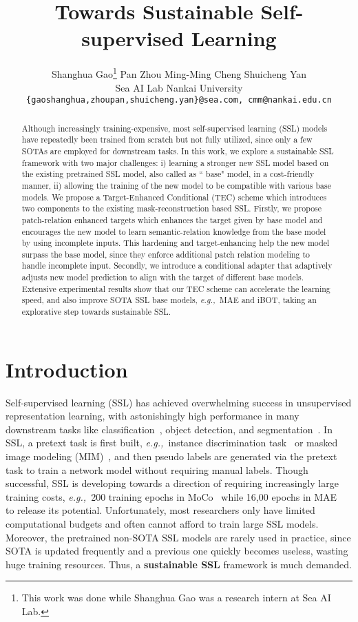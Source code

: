 \documentclass{article} \usepackage{iclr2023_conference,times}
\title{Towards Sustainable Self-supervised Learning}
\author{Shanghua Gao\thanks{This work was done while Shanghua Gao was a research intern at Sea AI Lab.} \quad
Pan Zhou \quad
Ming-Ming Cheng \quad
Shuicheng Yan \\
Sea AI Lab \quad Nankai University \\
\texttt{\{gaoshanghua,zhoupan,shuicheng.yan\}@sea.com, cmm@nankai.edu.cn} \\
}
\def\eg{\emph{e.g.,~}}
\begin{document}
\maketitle
\begin{abstract}

Although increasingly training-expensive, 
most self-supervised learning (SSL) models 
have repeatedly been trained from scratch
but not fully utilized, since 
only a few SOTAs are employed for downstream tasks. 
In this work, we explore a sustainable SSL framework 
with  two major challenges: 
i) learning a stronger new SSL model based on the existing 
pretrained SSL model, also called as `` base" model,  in a cost-friendly manner,
ii) allowing the training of the new model to be compatible with
various base models. 
We propose a Target-Enhanced Conditional (TEC) scheme 
which introduces two components to the existing mask-reconstruction based SSL.  
Firstly, we propose patch-relation enhanced targets which enhances the target given by base model and  encourages 
the new model to learn semantic-relation knowledge from the base model by using   
incomplete inputs. 
This hardening and target-enhancing help the new model surpass the base model, 
since they enforce additional patch relation modeling to handle incomplete input.  
Secondly, we introduce a conditional adapter that 
adaptively adjusts new model prediction to align with the target of different base models. 
Extensive experimental results show  that our TEC scheme can accelerate the 
learning speed, and also improve SOTA SSL base models, \eg MAE and iBOT,  
taking an explorative step towards sustainable SSL.
    
\end{abstract}

\section{Introduction}
\vspace{-10pt}
\label{sec:intro}
Self-supervised learning (SSL) has achieved overwhelming success 
in unsupervised representation learning, 
with astonishingly high performance in many downstream tasks 
like classification~\citep{zhou2021ibot,mugs2022SSL}, 
object detection, and segmentation~\citep{bao2021beit,he2022masked}.  
In SSL, a pretext task is first built, 
\eg instance discrimination task~\citep{He_2020_CVPR,chen2021mocov3} 
or masked image modeling (MIM)~\citep{bao2021beit,he2022masked},   
and then pseudo labels are generated via the pretext task to 
train a network model without requiring manual labels.  
Though successful, SSL is developing towards a direction of 
requiring increasingly large training costs,  
\eg 200 training epochs in MoCo~\citep{He_2020_CVPR}  
while 16,00 epochs in MAE~\citep{he2022masked} to release its potential. 
Unfortunately,  most researchers only have limited computational budgets 
and often cannot  afford to train large SSL models. 
Moreover, the pretrained non-SOTA SSL models are rarely used in practice, 
since  SOTA is updated frequently and a previous one quickly becomes useless, 
wasting huge training resources.  
Thus, a \textbf{sustainable SSL} framework is much demanded. 
\end{document}

